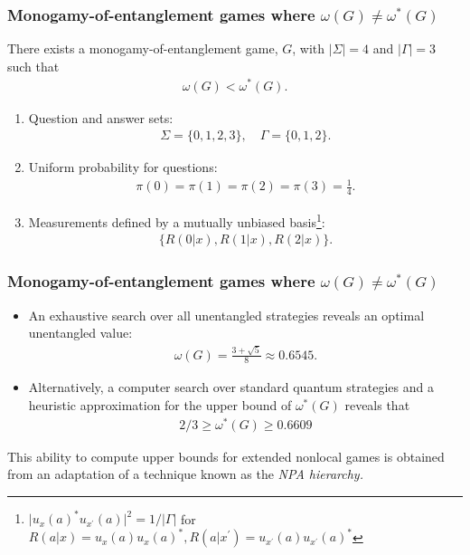 \documentclass{beamer}
\newcommand{\abs}[1]{\lvert #1 \rvert}
\begin{document}
\begin{frame}
	\frametitle{Monogamy-of-entanglement games where $\omega(G) \not= \omega^*(G)$}
		There exists a monogamy-of-entanglement game, $G$, with $\abs{\Sigma} = 4$ and $\abs{\Gamma} = 3$ such that 
		\begin{align*}
			\omega(G) < \omega^*(G). 
		\end{align*}
	\begin{enumerate}
		\item Question and answer sets:
			\begin{align*}
				\Sigma = \{0,1,2,3\}, \quad \Gamma = \{0,1,2\}.
			\end{align*}
		\item Uniform probability for questions:
			\begin{align*}
				\pi(0) = \pi(1) = \pi(2) = \pi(3) = \frac{1}{4}.
			\end{align*}
		\item Measurements defined by a mutually unbiased basis\footnote{$\abs{u_x(a)^* u_{x^{\prime}}(a)}^2 = 1/\abs{\Gamma}$ for $R(a|x) = u_x(a) u_x(a)^*, R(a|x^{\prime}) = u_{x^{\prime}}(a) u_{x^{\prime}}(a)^*$}:
			\begin{align*}
				\{ R(0|x), R(1|x), R(2|x) \}.
			\end{align*}
	\end{enumerate}
\end{frame}

\begin{frame}
	\frametitle{Monogamy-of-entanglement games where $\omega(G) \not= \omega^*(G)$}
	\begin{itemize}
	\item An exhaustive search over all unentangled strategies reveals an optimal unentangled value:
	\begin{align*}
		\omega(G) = \frac{3 + \sqrt{5}}{8} \approx 0.6545. 
	\end{align*}
	\item Alternatively, a computer search over standard quantum strategies and a heuristic approximation for the upper bound of $\omega^*(G)$ reveals that 
	\begin{align*}
		2/3 \geq \omega^*(G) \geq 0.6609
	\end{align*}
	\end{itemize}
This ability to compute upper bounds for extended nonlocal games is obtained from an adaptation of a technique known as the \emph{NPA hierarchy.}
\end{frame}
\end{document}
